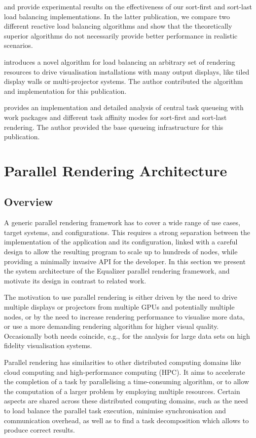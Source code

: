 \cite{EMP:09} and \cite{ESP:18} provide experimental results on the
effectiveness of our sort-first and sort-last load balancing implementations.
In the latter publication, we compare two different reactive load balancing
algorithms and show that the theoretically superior algorithms do not necessarily
provide better performance in realistic scenarios.

\cite{EEP:11} introduces a novel algorithm for load balancing an arbitrary set
of rendering resources to drive visualisation installations with many output
displays, like tiled display walls or multi-projector systems. The author
contributed the algorithm and implementation for this publication.

\cite{SPEP:16} provides an implementation and detailed analysis of central task
queueing with work packages and different task affinity modes for sort-first and
sort-last rendering. The author provided the base queueing infrastructure for
this publication.

\chapter{Parallel Rendering Architecture}\label{sArchitecture}

\section{Overview}

A generic parallel rendering framework has to cover a wide range of use cases,
target systems, and configurations. This requires a strong separation between
the implementation of the application and its configuration, linked with a
careful design to allow the resulting program to scale up to hundreds of nodes,
while providing a minimally invasive API for the developer. In this section we
present the system architecture of the Equalizer parallel rendering framework,
and motivate its design in contrast to related work.

The motivation to use parallel rendering is either driven by the need to drive
multiple displays or projectors from multiple GPUs and potentially multiple
nodes, or by the need to increase rendering performance to visualise
more data, or use a more demanding rendering algorithm for higher visual quality.
Occasionally both needs coincide, e.g., for the analysis for large data
sets on high fidelity visualisation systems.

Parallel rendering has similarities to other distributed computing domains like
cloud computing and high-performance computing (HPC). It aims to accelerate
the completion of a task by parallelising a time-consuming algorithm, or to
allow the computation of a larger problem by employing multiple resources. Certain
aspects are shared across these distributed computing domains, such as the need
to load balance the parallel task execution, minimise synchronisation and
communication overhead, as well as to find a task decomposition which allows
to produce correct results.


